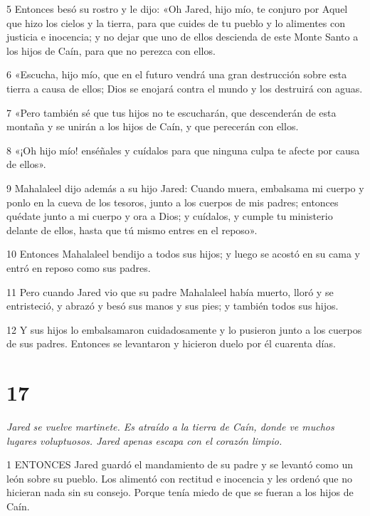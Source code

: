 \par 5 Entonces besó su rostro y le dijo: «Oh Jared, hijo mío, te conjuro por Aquel que hizo los cielos y la tierra, para que cuides de tu pueblo y lo alimentes con justicia e inocencia; y no dejar que uno de ellos descienda de este Monte Santo a los hijos de Caín, para que no perezca con ellos.

\par 6 «Escucha, hijo mío, que en el futuro vendrá una gran destrucción sobre esta tierra a causa de ellos; Dios se enojará contra el mundo y los destruirá con aguas.

\par 7 «Pero también sé que tus hijos no te escucharán, que descenderán de esta montaña y se unirán a los hijos de Caín, y que perecerán con ellos.

\par 8 «¡Oh hijo mío! enséñales y cuídalos para que ninguna culpa te afecte por causa de ellos».

\par 9 Mahalaleel dijo además a su hijo Jared: Cuando muera, embalsama mi cuerpo y ponlo en la cueva de los tesoros, junto a los cuerpos de mis padres; entonces quédate junto a mi cuerpo y ora a Dios; y cuídalos, y cumple tu ministerio delante de ellos, hasta que tú mismo entres en el reposo».

\par 10 Entonces Mahalaleel bendijo a todos sus hijos; y luego se acostó en su cama y entró en reposo como sus padres.

\par 11 Pero cuando Jared vio que su padre Mahalaleel había muerto, lloró y se entristeció, y abrazó y besó sus manos y sus pies; y también todos sus hijos.

\par 12 Y sus hijos lo embalsamaron cuidadosamente y lo pusieron junto a los cuerpos de sus padres. Entonces se levantaron y hicieron duelo por él cuarenta días.

\chapter{17}

\par \textit{Jared se vuelve martinete. Es atraído a la tierra de Caín, donde ve muchos lugares voluptuosos. Jared apenas escapa con el corazón limpio.}

\par 1 ENTONCES Jared guardó el mandamiento de su padre y se levantó como un león sobre su pueblo. Los alimentó con rectitud e inocencia y les ordenó que no hicieran nada sin su consejo. Porque tenía miedo de que se fueran a los hijos de Caín.

